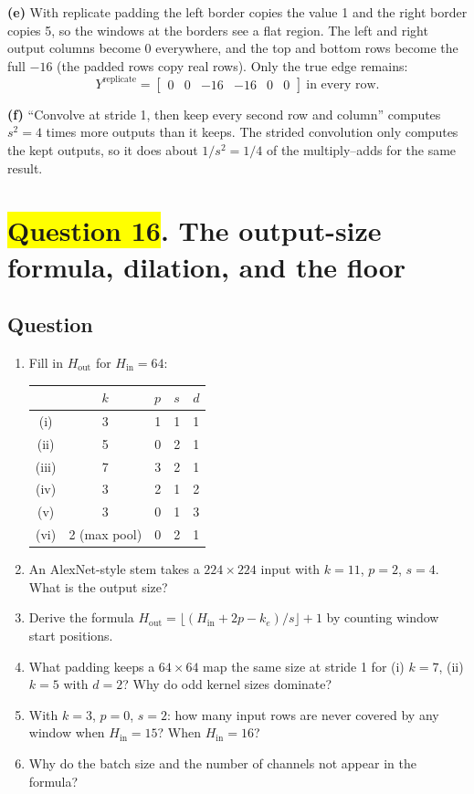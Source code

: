\documentclass[12pt,a4paper]{article}
\newcommand{\hlq}[1]{{\setlength{\fboxsep}{1.5pt}\colorbox{yellow}{#1}}}
\begin{document}
\textbf{(e)} With replicate padding the left border copies the value 1 and the right border copies 5, so the windows at the borders see a flat region. The left and right output columns become 0 everywhere, and the top and bottom rows become the full $-16$ (the padded rows copy real rows). Only the true edge remains:
\[
Y^{\text{replicate}}=\begin{bmatrix}0&0&-16&-16&0&0\end{bmatrix}\ \text{in every row}.
\]

\textbf{(f)} ``Convolve at stride 1, then keep every second row and column'' computes $s^2=4$ times more outputs than it keeps. The strided convolution only computes the kept outputs, so it does about $1/s^2=1/4$ of the multiply--adds for the same result.

\section[Question 16. The output-size formula, dilation, and the floor]{\hlq{Question 16}. The output-size formula, dilation, and the floor}
\subsection*{Question}
\begin{enumerate}[label=(\alph*)]
\item Fill in $H_{\text{out}}$ for $H_{\text{in}}=64$:
\begin{center}
\begin{tabular}{@{}ccccc@{}}
\toprule
& $k$ & $p$ & $s$ & $d$\\
\midrule
(i) & 3 & 1 & 1 & 1\\
(ii) & 5 & 0 & 2 & 1\\
(iii) & 7 & 3 & 2 & 1\\
(iv) & 3 & 2 & 1 & 2\\
(v) & 3 & 0 & 1 & 3\\
(vi) & 2 (max pool) & 0 & 2 & 1\\
\bottomrule
\end{tabular}
\end{center}
\item An AlexNet-style stem takes a $224\times224$ input with $k=11$, $p=2$, $s=4$. What is the output size?
\item Derive the formula $H_{\text{out}}=\lfloor(H_{\text{in}}+2p-k_e)/s\rfloor+1$ by counting window start positions.
\item What padding keeps a $64\times64$ map the same size at stride 1 for (i) $k=7$, (ii) $k=5$ with $d=2$? Why do odd kernel sizes dominate?
\item With $k=3$, $p=0$, $s=2$: how many input rows are never covered by any window when $H_{\text{in}}=15$? When $H_{\text{in}}=16$?
\item Why do the batch size and the number of channels not appear in the formula?
\end{enumerate}
\end{document}
